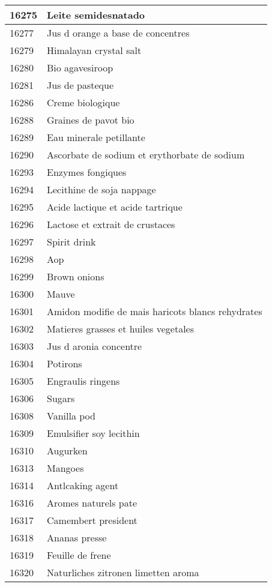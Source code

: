 \begin{longtable}{|l|l|}
16275 & Leite semidesnatado \\ \hline 
16277 & Jus d orange a base de concentres \\ \hline 
16279 & Himalayan crystal salt \\ \hline 
16280 & Bio agavesiroop \\ \hline 
16281 & Jus de pasteque \\ \hline 
16286 & Creme biologique \\ \hline 
16288 & Graines de pavot bio \\ \hline 
16289 & Eau minerale petillante \\ \hline 
16290 & Ascorbate de sodium et erythorbate de sodium \\ \hline 
16293 & Enzymes fongiques \\ \hline 
16294 & Lecithine de soja nappage \\ \hline 
16295 & Acide lactique et acide tartrique \\ \hline 
16296 & Lactose et extrait de crustaces \\ \hline 
16297 & Spirit drink \\ \hline 
16298 & Aop \\ \hline 
16299 & Brown onions \\ \hline 
16300 & Mauve \\ \hline 
16301 & Amidon modifie de mais haricots blancs rehydrates \\ \hline 
16302 & Matieres grasses et huiles vegetales \\ \hline 
16303 & Jus d aronia concentre \\ \hline 
16304 & Potirons \\ \hline 
16305 & Engraulis ringens \\ \hline 
16306 & Sugars \\ \hline 
16308 & Vanilla pod \\ \hline 
16309 & Emulsifier soy lecithin \\ \hline 
16310 & Augurken \\ \hline 
16313 & Mangoes \\ \hline 
16314 & Antlcaking agent \\ \hline 
16316 & Aromes naturels pate \\ \hline 
16317 & Camembert president \\ \hline 
16318 & Ananas presse \\ \hline 
16319 & Feuille de frene \\ \hline 
16320 & Naturliches zitronen limetten aroma \\ \hline 

\end{longtable}
